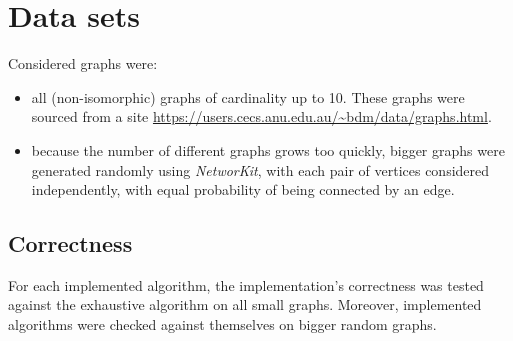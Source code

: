 \section{Data sets}
Considered graphs were: 
\begin{itemize}
    \item all (non-isomorphic) graphs of cardinality up to 10. These graphs were sourced from a site \url{https://users.cecs.anu.edu.au/~bdm/data/graphs.html}.
    \item because the number of different graphs grows too quickly, bigger graphs were generated randomly using \textit{NetworKit}, with each pair of vertices considered independently, with equal probability of being connected by an edge. 
\end{itemize}
\subsection{Correctness}
For each implemented algorithm, the implementation's correctness was tested against the exhaustive algorithm on all small graphs. Moreover, implemented algorithms were checked against themselves on bigger random graphs.

